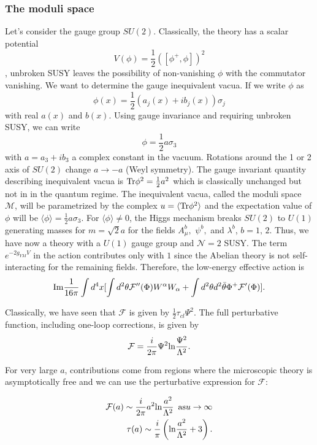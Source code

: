 \documentclass[12pt, onecolumn]{article}
\begin{document}
\subsubsection{The moduli space}

Let's consider the gauge group $SU(2)$. Classically, the theory has a scalar potential $$ V(\phi)=\frac{1}{2}([\phi^+,\phi])^2$$, unbroken SUSY leaves the possibility of non-vanishing $\phi$ with the commutator vanishing. We want to  determine the gauge inequivalent vacua. If we write $\phi$ as $$\phi(x)=\frac{1}{2}(a_j(x)+ib_j(x))\sigma_j$$ with real  $a(x)$ and $b(x)$. Using gauge invariance and requiring unbroken SUSY, we can write $$\phi=\frac{1}{2}a\sigma_3$$ with $a=a_3+ib_3$ a complex constant in the vacuum. Rotations around the 1 or 2 axis of $SU(2)$ change $a\rightarrow-a$ (Weyl symmetry). The gauge invariant quantity describing inequivalent vacua is ${\rm Tr} \phi^2 = \frac{1}{2}a^2$ which is classically unchanged but not in in the quantum regime. The inequivalent vacua, called the moduli space $\mathcal{M}$, will be parametrized by the complex $u=\langle {\rm Tr} \phi^2\rangle $ and the expectation value of $\phi$ will be $\langle \phi \rangle =  \frac{1}{2} a \sigma_3$. For $\langle \phi \rangle \neq 0$, the Higgs mechanism breaks $SU(2)$ to $U(1)$ generating masses for $m=\sqrt{2}a$ for the fields $A^b_\mu,\,\,\psi^b,$ and $\lambda^b$, $b=1,\,2$. Thus, we have now a theory with a $U(1)$ gauge group and $\mathcal{N}=2$ SUSY.  The term $e^{-2g_{YM} V}$ in the action contributes only with $1$ since the Abelian theory is not self-interacting for the remaining fields. Therefore, the low-energy effective action is 
\begin{equation}
{\rm Im} \frac{1}{16\pi}\int d^4x [ \int d^2 \theta \mathcal{F}''(\Phi) W^{\alpha}W_\alpha + \int d^2\theta d^2 \bar{\theta} \Phi^+ \mathcal{F}'(\Phi)]. \label{eff-action}
\end{equation}

Classically, we have seen that $\mathcal{F}$ is given by $\frac{1}{2} \tau_{cl}\Psi^2$. The full perturbative function, including one-loop corrections, is given by 
\begin{equation}
\mathcal{F} = \frac{i}{2\pi}\Psi^2 {\rm ln}\frac{\Psi^2}{\Lambda^2}.
\end{equation}

For very large $a$, contributions come from regions where the microscopic theory is asymptotically free and we can use the perturbative expression for $\mathcal{F}$:

\begin{eqnarray}
\mathcal{F}(a)\sim \frac{i}{2\pi}a^2 {\rm ln}\frac{a^2}{\Lambda^2} \,\,\,{\rm as } u\rightarrow \infty \nonumber \\
\tau(a) \sim \frac{i}{\pi}\left( {\rm ln} \frac{a^2}{\Lambda^2}+3\right). \label{inf}
\end{eqnarray}
\end{document}
